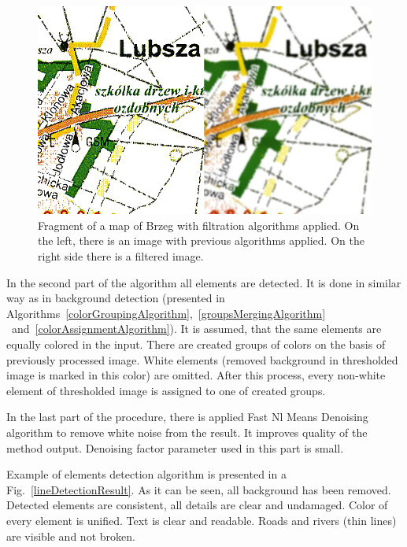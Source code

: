 \documentclass[a4paper,onecolumn,oneside,12pt]{memoir}
\begin{document}
\begin{figure}[!ht]
\begin{center}
\includegraphics[scale=0.6]{images/filtrationResult.png}
\caption{Fragment of a map of Brzeg with filtration algorithms applied.
On the left, there is an image with previous algorithms applied. On the right side there is a
filtered image.}
\label{contoursFiltrationResult}
\end{center}
\end{figure}

In the second part of the algorithm all elements are detected. It is done in similar way as in
background detection (presented in Algorithms~\ref{colorGroupingAlgorithm},~\ref{groupsMergingAlgorithm}
~and~\ref{colorAssignmentAlgorithm}). It is assumed, that the same elements are equally colored in
the input. There are created groups of colors on the basis of previously processed image. White
elements  (removed background in thresholded image is marked in this color) are omitted. After this
process, every non-white element of thresholded image is assigned to one of created groups.

In the last part of the procedure, there is applied Fast Nl Means Denoising algorithm to remove
white noise from the result. It improves quality of the method output. Denoising factor parameter
used in this part is small.

Example of elements detection algorithm is presented in a Fig.~\ref{lineDetectionResult}. As it can
be seen, all background has been removed. Detected elements are consistent, all details are clear
and undamaged. Color of every element is unified. Text is clear and readable. Roads and rivers
 (thin lines) are visible and not broken.
\end{document}
